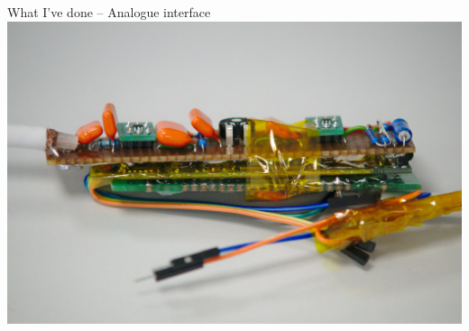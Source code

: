 \documentclass[aspectratio=169,11pt, xcolor={table}]{beamer}
\begin{document}
\begin{frame}{What I've done -- Analogue interface}
	\centering
	\includegraphics[height=0.8\textheight]{figs/analogue}
\end{frame}
\end{document}
